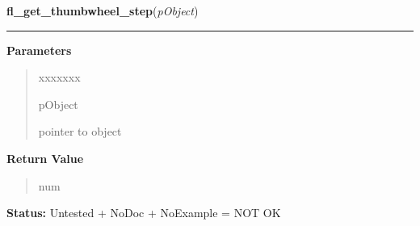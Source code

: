     \label{xformslib:library:fl_get_thumbwheel_step}

    \vspace{0.5ex}

\hspace{.8\funcindent}\begin{boxedminipage}{\funcwidth}

    \raggedright \textbf{fl\_get\_thumbwheel\_step}(\textit{pObject})

    \vspace{-1.5ex}

    \rule{\textwidth}{0.5\fboxrule}
\setlength{\parskip}{2ex}
\setlength{\parskip}{1ex}
      \textbf{Parameters}
      \vspace{-1ex}

      \begin{quote}
        \begin{Ventry}{xxxxxxx}

          \item[pObject]

          pointer to object

        \end{Ventry}

      \end{quote}

      \textbf{Return Value}
    \vspace{-1ex}

      \begin{quote}
      num

      \end{quote}

\textbf{Status:} Untested + NoDoc + NoExample = NOT OK



    \end{boxedminipage}

    \label{xformslib:library:fl_set_thumbwheel_step}

    \vspace{0.5ex}

